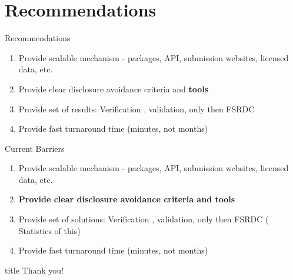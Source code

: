 \section{Recommendations}
\begin{frame}{Recommendations}
	\begin{enumerate}
		\item Provide scalable mechanism - packages, API, submission websites, licensed data, etc.
		\item Provide clear disclosure avoidance criteria and \textbf{tools}
		\item Provide set of results: Verification \citep{reiterVerificationServersEnabling2009,barrientos2018a}, validation, only then FSRDC 
		\item Provide fast turnaround time (minutes, not months)
	\end{enumerate}
\end{frame}


\begin{frame}{Current Barriers}
	\begin{enumerate}
		\item Provide scalable mechanism - packages, API, submission websites, licensed data, etc.
		\item {\color{orange} \bf Provide clear disclosure avoidance criteria and \textbf{tools}}
		\item Provide set of solutions: Verification \citep{reiterVerificationServersEnabling2009,barrientos2018a}, validation, only then FSRDC ({\color{orange} Statistics of this})
		\item Provide fast turnaround time (minutes, not months)
	\end{enumerate}
\end{frame}


\begin{frame}
	\vfill
	\centering
	\begin{beamercolorbox}[sep=8pt,center,shadow=true,rounded=true]{title}
		Thank you!\par%
	\end{beamercolorbox}
	\vfill
\end{frame}







